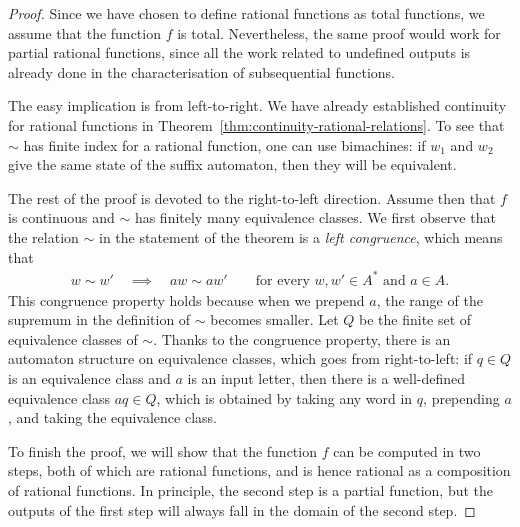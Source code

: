 \begin{proof}
    Since we have chosen to define rational functions as total functions, we assume that the function $f$ is total. Nevertheless, the same proof would work for partial rational functions, since all  the work related to undefined outputs is already done in the characterisation of subsequential functions.


    The easy implication is from left-to-right. We have already established continuity for rational functions in Theorem~\ref{thm:continuity-rational-relations}. To see that $\sim$ has finite index for a rational function, one can use bimachines: if $w_1$ and $w_2$ give the same state of the suffix automaton, then they will be equivalent. 
    
    The rest of the proof is devoted to the right-to-left direction. Assume then that $f$ is continuous and $\sim$ has finitely many equivalence classes. 
    We first observe that the relation  $\sim$ in the statement of the theorem  is a \emph{left congruence}, which means that 
\begin{align*}
w \sim w' \quad \implies \quad aw \sim aw' \qquad \text{for every $w,w' \in A^*$ and $a \in A$}.
\end{align*}
This congruence property holds because when we prepend $a$, the range of the supremum in the definition of $\sim$ becomes smaller. 
Let $Q$ be the finite set of equivalence classes of $\sim$.  Thanks to the congruence property, there is an automaton structure on equivalence classes, which goes from right-to-left: if $q \in Q$ is an equivalence class and $a$ is an input letter, then there is a well-defined equivalence class $aq \in Q$, which is obtained by taking any word in $q$, prepending $a$, and taking the equivalence class.

To finish the proof, we will show that the function $f$ can be computed in two steps, both of which are rational functions, and is hence rational as a composition of rational functions. In principle, the second step is a partial function, but the outputs of the first step will always fall in the domain of the second step.


\end{proof}
